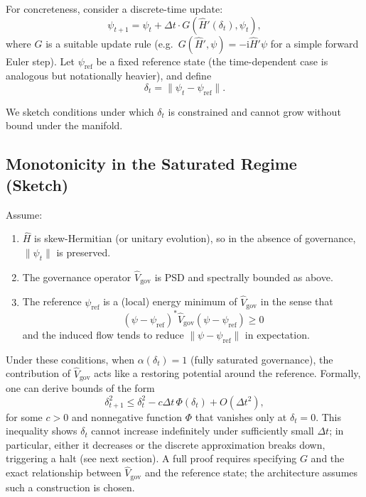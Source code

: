 \documentclass[11pt]{article}
\begin{document}
For concreteness, consider a discrete-time update:
\begin{equation}
  \psi_{t+1} = \psi_t + \Delta t\cdot G(\hat{H}'(\delta_t), \psi_t),
\end{equation}
where $G$ is a suitable update rule (e.g.\ $G(\hat{H}',\psi) = -\mathrm{i}\hat{H}'\psi$ for a simple forward Euler step).
Let $\psi_{\mathrm{ref}}$ be a fixed reference state (the time-dependent case is analogous but notationally heavier), and define
\begin{equation}
  \delta_t = \|\psi_t - \psi_{\mathrm{ref}}\|.
\end{equation}

We sketch conditions under which $\delta_t$ is constrained and cannot grow without bound under the manifold.

\subsection{Monotonicity in the Saturated Regime (Sketch)}

Assume:
\begin{enumerate}[noitemsep]
  \item $\hat{H}$ is skew-Hermitian (or unitary evolution), so in the absence of governance, $\|\psi_t\|$ is preserved.
  \item The governance operator $\hat{V}_{\mathrm{gov}}$ is PSD and spectrally bounded as above.
  \item The reference $\psi_{\mathrm{ref}}$ is a (local) energy minimum of $\hat{V}_{\mathrm{gov}}$ in the sense that
  \begin{equation}
    (\psi - \psi_{\mathrm{ref}})^\ast \hat{V}_{\mathrm{gov}} (\psi - \psi_{\mathrm{ref}}) \ge 0
  \end{equation}
  and the induced flow tends to reduce $\|\psi - \psi_{\mathrm{ref}}\|$ in expectation.
\end{enumerate}

Under these conditions, when $\alpha(\delta_t) = 1$ (fully saturated governance), the contribution of $\hat{V}_{\mathrm{gov}}$ acts like a restoring potential around the reference.
Formally, one can derive bounds of the form
\begin{equation}
  \delta_{t+1}^2 \le \delta_t^2 - c\Delta t\,\Phi(\delta_t) + O(\Delta t^2),
\end{equation}
for some $c>0$ and nonnegative function $\Phi$ that vanishes only at $\delta_t = 0$.
This inequality shows $\delta_t$ cannot increase indefinitely under sufficiently small $\Delta t$; in particular, either it decreases or the discrete approximation breaks down, triggering a halt (see next section).
A full proof requires specifying $G$ and the exact relationship between $\hat{V}_{\mathrm{gov}}$ and the reference state; the architecture assumes such a construction is chosen.
\end{document}
